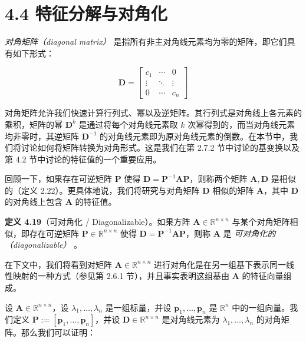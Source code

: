 \section*{4.4 特征分解与对角化}
\label{sec:4.4}

\emph{对角矩阵（diagonal matrix）} 是指所有非主对角线元素均为零的矩阵，即它们具有如下形式：

\begin{equation}
\boldsymbol{D} = \begin{bmatrix} c_1 & \cdots & 0 \\ \vdots & \ddots & \vdots \\ 0 & \cdots & c_n \end{bmatrix}
\tag{4.49}\label{eq:4-49}
\end{equation}

对角矩阵允许我们快速计算行列式、幂以及逆矩阵。其行列式是对角线上各元素的乘积，矩阵的幂 $ \boldsymbol{D}^k $ 是通过将每个对角线元素取 $ k $ 次幂得到的，而当对角线元素均非零时，其逆矩阵 $ \boldsymbol{D}^{-1} $ 的对角线元素即为原对角线元素的倒数。在本节中，我们将讨论如何将矩阵转换为对角形式。这是我们在第 2.7.2 节中讨论的基变换以及第 4.2 节中讨论的特征值的一个重要应用。

回顾一下，如果存在可逆矩阵 $ \boldsymbol{P} $ 使得 $ \boldsymbol{D} = \boldsymbol{P}^{-1} \boldsymbol{A} \boldsymbol{P} $，则称两个矩阵 $ \boldsymbol{A}, \boldsymbol{D} $ 是相似的（定义 2.22）。更具体地说，我们将研究与对角矩阵 $ \boldsymbol{D} $ 相似的矩阵 $ \boldsymbol{A} $，其中 $ \boldsymbol{D} $ 的对角线上包含 $ \boldsymbol{A} $ 的特征值。

\textbf{定义 4.19}（可对角化 / Diagonalizable）。如果方阵 $ \boldsymbol{A} \in \mathbb{R}^{n \times n} $ 与某个对角矩阵相似，即存在可逆矩阵 $ \boldsymbol{P} \in \mathbb{R}^{n \times n} $ 使得 $ \boldsymbol{D} = \boldsymbol{P}^{-1} \boldsymbol{A} \boldsymbol{P} $，则称 $ \boldsymbol{A} $ 是 \emph{可对角化的（diagonalizable）} 。

在下文中，我们将看到对矩阵 $ \boldsymbol{A} \in \mathbb{R}^{n \times n} $ 进行对角化是在另一组基下表示同一线性映射的一种方式（参见第 2.6.1 节），并且事实表明这组基由 $ \boldsymbol{A} $ 的特征向量组成。

设 $ \boldsymbol{A} \in \mathbb{R}^{n \times n} $，设 $ \lambda_1, \ldots, \lambda_n $ 是一组标量，并设 $ \boldsymbol{p}_1, \ldots, \boldsymbol{p}_n $ 是 $ \mathbb{R}^n $ 中的一组向量。我们定义 $ \boldsymbol{P} := [\boldsymbol{p}_1, \ldots, \boldsymbol{p}_n] $，并设 $ \boldsymbol{D} \in \mathbb{R}^{n \times n} $ 是对角线元素为 $ \lambda_1, \ldots, \lambda_n $ 的对角矩阵。那么我们可以证明：

